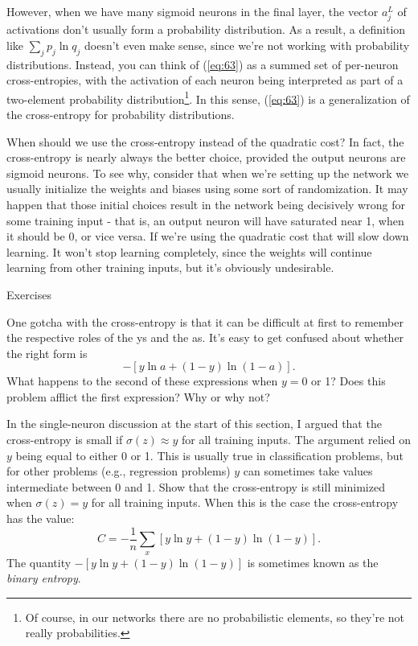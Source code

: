 \documentclass[a4paper,twoside,10pt]{book}
\begin{document}
However, when we have many sigmoid neurons in the final layer, the vector $a^L_j$ of activations don't usually form a probability distribution. As a result, a definition like $\sum_j p_j \ln q_j$ doesn't even make sense, since we're not working with probability distributions. Instead, you can think of (\ref{eq:63}) as a summed set of per-neuron cross-entropies, with the activation of each neuron being interpreted as part of a two-element probability distribution\footnote{Of course, in our networks there are no probabilistic elements, so they're not really probabilities.}. In this sense, (\ref{eq:63}) is a generalization of the cross-entropy for probability distributions.

When should we use the cross-entropy instead of the quadratic cost? In fact, the cross-entropy is nearly always the better choice, provided the output neurons are sigmoid neurons. To see why, consider that when we're setting up the network we usually initialize the weights and biases using some sort of randomization. It may happen that those initial choices result in the network being decisively wrong for some training input - that is, an output neuron will have saturated near 1, when it should be 0, or vice versa. If we're using the quadratic cost that will slow down learning. It won't stop learning completely, since the weights will continue learning from other training inputs, but it's obviously undesirable.


\begin{exercize}{Exercises}
	\item One gotcha with the cross-entropy is that it can be difficult at first to remember the respective roles of the ys and the as. It's easy to get confused about whether the right form is $$-[y \ln a + (1-y) \ln (1-a)].$$ What happens to the second of these expressions when $y=0$ or 1? Does this problem afflict the first expression? Why or why not?
	\item In the single-neuron discussion at the start of this section, I argued that the cross-entropy is small if $\sigma(z)\approx y$ for all training inputs. The argument relied on $y$ being equal to either 0 or 1. This is usually true in classification problems, but for other problems (e.g., regression problems) $y$ can sometimes take values intermediate between 0 and 1. Show that the cross-entropy is still minimized when $\sigma(z)=y$ for all training inputs. When this is the case the cross-entropy has the value:
	\begin{equation}
		C = -\frac{1}{n} \sum_x [y \ln y+(1-y) \ln(1-y)].
		\label{eq:64}
	\end{equation}
	The quantity $-[y \ln y+(1-y) \ln(1-y)]$ is sometimes known as the \textit{binary entropy}.
\end{exercize}
\end{document}
